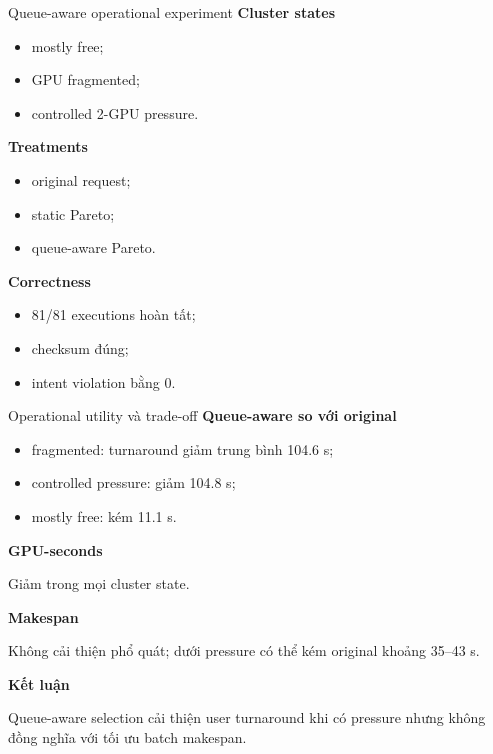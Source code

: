 \begin{frame}[t,shrink=20]{Queue-aware operational experiment}
\scriptsize
\vspace{0.15em}
\textbf{Cluster states}\par
\begin{itemize}
\item mostly free;
\item GPU fragmented;
\item controlled 2-GPU pressure.
\end{itemize}
\vspace{0.15em}
\textbf{Treatments}\par
\begin{itemize}
\item original request;
\item static Pareto;
\item queue-aware Pareto.
\end{itemize}
\vspace{0.15em}
\textbf{Correctness}\par
\begin{itemize}
\item 81/81 executions hoàn tất;
\item checksum đúng;
\item intent violation bằng 0.
\end{itemize}
\end{frame}

\begin{frame}[t,shrink=20]{Operational utility và trade-off}
\scriptsize
\vspace{0.15em}
\textbf{Queue-aware so với original}\par
\begin{itemize}
\item fragmented: turnaround giảm trung bình 104.6 s;
\item controlled pressure: giảm 104.8 s;
\item mostly free: kém 11.1 s.
\end{itemize}
\vspace{0.15em}
\textbf{GPU-seconds}\par
Giảm trong mọi cluster state.\par
\vspace{0.15em}
\textbf{Makespan}\par
Không cải thiện phổ quát; dưới pressure có thể kém original khoảng 35–43 s.\par
\vspace{0.15em}
\textbf{Kết luận}\par
Queue-aware selection cải thiện user turnaround khi có pressure nhưng không đồng nghĩa với tối ưu batch makespan.\par
\end{frame}
